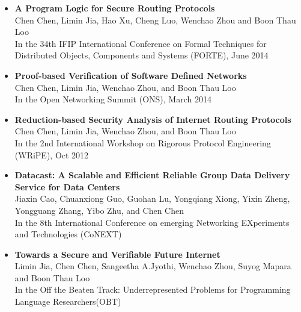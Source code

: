 \begin{itemize}
\item {\bf A Program Logic for Secure Routing Protocols} \\
Chen Chen, Limin Jia, Hao Xu, Cheng Luo, Wenchao Zhou and Boon Thau Loo\\
In the 34th IFIP International Conference on Formal Techniques for Distributed
Objects, Components and Systems (FORTE), June 2014\\
\item {\bf Proof-based Verification of Software Defined Networks} \\
Chen Chen, Limin Jia, Wenchao Zhou, and Boon Thau Loo \\
In the Open Networking Summit (ONS), March 2014\\
\item {\bf Reduction-based Security Analysis of Internet Routing Protocols} \\
Chen Chen, Limin Jia, Wenchao Zhou, and Boon Thau Loo \\
In the 2nd International Workshop on Rigorous Protocol Engineering (WRiPE), Oct 2012 \\
\item {\bf Datacast: A Scalable and Efficient Reliable Group Data Delivery Service for Data Centers} \\
Jiaxin Cao, Chuanxiong Guo, Guohan Lu, Yongqiang Xiong, Yixin Zheng, Yongguang
Zhang, Yibo Zhu, and Chen Chen \\
In the 8th International Conference on emerging Networking EXperiments and Technologies (CoNEXT)\\
\item {\bf Towards a Secure and Verifiable Future Internet} \\
Limin Jia, Chen Chen, Sangeetha A.Jyothi, Wenchao Zhou, Suyog Mapara and Boon Thau Loo \\
In the Off the Beaten Track: Underrepresented Problems for Programming Language Researchers(OBT)\\
\end{itemize}

